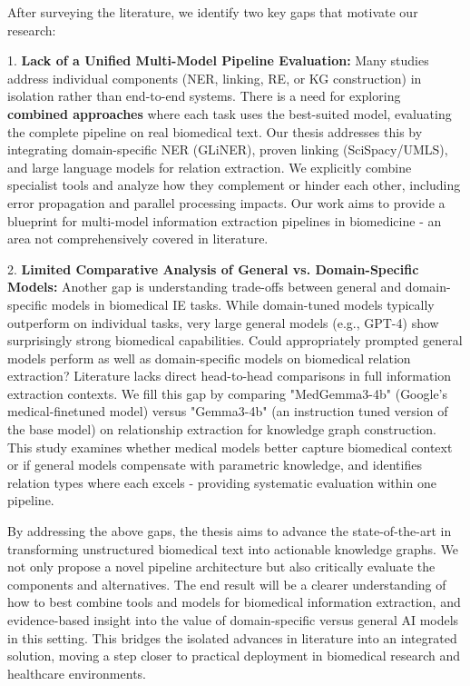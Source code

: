 After surveying the literature, we identify two key gaps that motivate our research:

1. \textbf{Lack of a Unified Multi-Model Pipeline Evaluation:} Many studies address individual components (NER, linking, RE, or KG construction) in isolation rather than end-to-end systems. There is a need for exploring \textbf{combined approaches} where each task uses the best-suited model, evaluating the complete pipeline on real biomedical text. Our thesis addresses this by integrating domain-specific NER (GLiNER), proven linking (SciSpacy/UMLS), and large language models for relation extraction. We explicitly combine specialist tools and analyze how they complement or hinder each other, including error propagation and parallel processing impacts. Our work aims to provide a blueprint for multi-model information extraction pipelines in biomedicine - an area not comprehensively covered in literature.

2. \textbf{Limited Comparative Analysis of General vs. Domain-Specific Models:} Another gap is understanding trade-offs between general and domain-specific models in biomedical IE tasks. While domain-tuned models typically outperform on individual tasks, very large general models (e.g., GPT-4) show surprisingly strong biomedical capabilities. Could appropriately prompted general models perform as well as domain-specific models on biomedical relation extraction? Literature lacks direct head-to-head comparisons in full information extraction contexts. We fill this gap by comparing "MedGemma3-4b" (Google's medical-finetuned model) versus "Gemma3-4b" (an instruction tuned version of the base model) on relationship extraction for knowledge graph construction. This study examines whether medical models better capture biomedical context or if general models compensate with parametric knowledge, and identifies relation types where each excels - providing systematic evaluation within one pipeline.

By addressing the above gaps, the thesis aims to advance the state-of-the-art in transforming unstructured biomedical text into actionable knowledge graphs. We not only propose a novel pipeline architecture but also critically evaluate the components and alternatives. The end result will be a clearer understanding of how to best combine tools and models for biomedical information extraction, and evidence-based insight into the value of domain-specific versus general AI models in this setting. This bridges the isolated advances in literature into an integrated solution, moving a step closer to practical deployment in biomedical research and healthcare environments.
